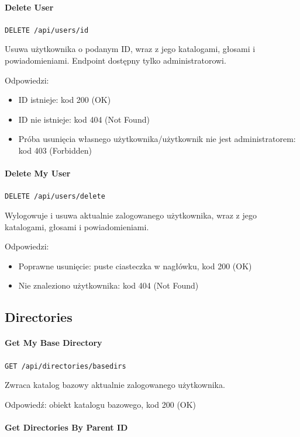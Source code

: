 \documentclass[a4paper,twoside,12pt]{book}
\begin{document}
\paragraph{Delete User}

\texttt{DELETE /api/users/{id}}

Usuwa użytkownika o podanym ID, wraz z jego katalogami, głosami i powiadomieniami. Endpoint dostępny tylko administratorowi.

Odpowiedzi: 
\begin{itemize}
	\item ID istnieje: kod 200 (OK) 
	\item ID nie istnieje: kod 404 (Not Found) 
	\item Próba usunięcia własnego użytkownika/użytkownik nie jest administratorem: kod 403 (Forbidden)
\end{itemize}

\paragraph{Delete My User}

\texttt{DELETE /api/users/delete}

Wylogowuje i usuwa aktualnie zalogowanego użytkownika, wraz z jego katalogami, głosami i powiadomieniami.

Odpowiedzi: 
\begin{itemize}
	\item  Poprawne usunięcie: puste ciasteczka w nagłówku, kod 200 (OK) 
	\item  Nie znaleziono użytkownika: kod 404 (Not Found)
\end{itemize}

\subsection{Directories}

\paragraph{Get My Base Directory}

\texttt{GET /api/directories/basedirs}

Zwraca katalog bazowy aktualnie zalogowanego użytkownika.

Odpowiedź: obiekt katalogu bazowego, kod 200 (OK)

\paragraph{Get Directories By Parent ID}
\end{document}
